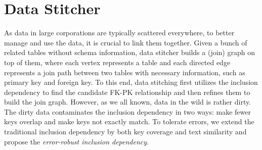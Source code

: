 \section{Data Stitcher}
\label{sec:stitching}

\newcommand{\eind}{error-robust inclusion dependency\xspace}
\newcommand{\ind}{inclusion dependency\xspace}
\newcommand{\R}{\ensuremath{R}\xspace}
\renewcommand{\S}{\ensuremath{S}\xspace}
\newcommand{\X}{\ensuremath{X}\xspace}
\newcommand{\Y}{\ensuremath{Y}\xspace}
\newcommand{\RX}{\ensuremath{\R[\X]}\xspace}
\newcommand{\SY}{\ensuremath{\S[\Y]}\xspace}
\newcommand{\IND}{IND\ensuremath{(\X,\Y)}\xspace}
\newcommand{\EIND}{\texttt{EIND}\ensuremath{(\RX,\SY)}\xspace}
\newcommand\subsetsim{\mathrel{%
  \ooalign{\raise0.3ex\hbox{$\subset$}\cr\hidewidth\raise-0.6ex\hbox{\scalebox{0.8}{$\sim$}}\hidewidth\cr}}}
\newcommand{\G}{\ensuremath{G}\xspace}
\newcommand{\E}{\ensuremath{E}\xspace}
\newcommand{\U}{\ensuremath{U}\xspace}
\newcommand{\V}{\ensuremath{V}\xspace}

\newtheorem{theorem}{Theorem}
\newtheorem{example}{Example}
\newtheorem{definition}{Definition}
\newtheorem{proposition}{Proposition}
\newtheorem{lemma}{Lemma}
\newtheorem{corollary}{Corollary}







As data in large corporations are typically scattered everywhere, to better manage and use the data, it is crucial to link them together. Given a bunch of related tables without schema information, data stitcher builds a (join) graph on top of them, where each vertex represents a table and each directed edge represents a join path between two tables with necessary information, such as primary key and foreign key. To this end, data stitching first utilizes the inclusion dependency to find the candidate FK-PK relationship and then refines them to build the join graph. However, as we all known, data in the wild is rather dirty. The dirty data contaminates the inclusion dependency in two ways: make fewer keys overlap and make keys not exactly match. To tolerate errors, we extend the traditional inclusion dependency by both key coverage and text similarity and propose the \emph{\eind}. 

